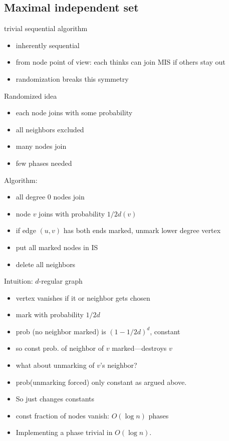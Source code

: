 \documentclass[12pt]{article}
\begin{document}
\subsection*{Maximal independent set}

trivial sequential algorithm
\begin{itemize}
\item inherently sequential
\item from node point of view: each thinks can join MIS if others stay
  out
\item randomization breaks this symmetry
\end{itemize}

Randomized idea
\begin{itemize}
\item each node joins with some probability
\item all neighbors excluded
\item many nodes join
\item few phases needed
\end{itemize}


Algorithm:
\begin{itemize}
\item all degree 0 nodes join
\item node $v$ joins with probability $1/2d(v)$
\item if edge $(u,v)$ has both ends marked, unmark lower degree vertex
\item put all marked nodes in IS
\item delete all neighbors
\end{itemize}


Intuition: $d$-regular graph
\begin{itemize}
\item vertex vanishes if it or neighbor gets chosen
\item mark with probability $1/2d$
\item prob (no neighbor marked) is $(1-1/2d)^d$, constant
\item so const prob. of neighbor of $v$ marked---destroys $v$
\item what about unmarking of $v$'s neighbor?
\item prob(unmarking forced) only constant as argued above.  
\item So just changes constants
\item const fraction of nodes vanish: $O(\log n)$ phases
\item Implementing a phase trivial in $O(\log n)$.
\end{itemize}
\end{document}
